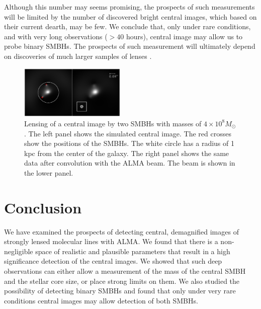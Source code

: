 \documentclass[chicago]{emulateapj}
\begin{document}
  Although this number may seems promising, the prospects of such measurements will be limited by the number of discovered bright central images, which based on their current dearth, may be few.
We conclude that, only under rare conditions, and with very long observations ($>40$ hours), central image may allow us to probe binary SMBHs. The prospects of such measurement will ultimately depend on discoveries of much larger samples of lenses \citep{}. 




\begin{figure}
\begin{center}
\centering
\includegraphics[trim= 20 0 20 0, width=0.45\textwidth]{figures/f_05.eps}
\centering
\end{center}
\caption{ Lensing of a central image by two SMBHs with masses of $4\times 10^8M_{\odot}$. The left panel shows the simulated central image. The red crosses show the positions of the SMBHs. The white circle has a radius of 1 kpc  from the center of the galaxy. The right panel shows the same data after convolution with the ALMA beam. The beam is shown in the lower panel.
\label{fig:5}}
\end{figure}



\section{Conclusion}
We have examined the prospects of detecting central, demagnified images of strongly lensed molecular lines with ALMA. We found that there is a non-negligible space of realistic and plausible parameters that result in a high significance detection of the central images. We showed that such deep observations can either allow a measurement of the mass of the central SMBH and the stellar core size, or place strong limits on them.
We also studied the possibility of detecting binary SMBHs and found that only under very rare conditions central images may allow detection of both SMBHs. 







%
\end{document}
